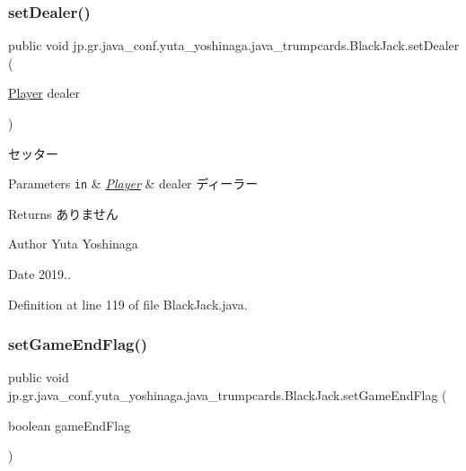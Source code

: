 \subsubsection{\texorpdfstring{set\+Dealer()}{setDealer()}}
{\footnotesize\ttfamily public void jp.\+gr.\+java\+\_\+conf.\+yuta\+\_\+yoshinaga.\+java\+\_\+trumpcards.\+Black\+Jack.\+set\+Dealer (\begin{DoxyParamCaption}\item[{\hyperlink{classjp_1_1gr_1_1java__conf_1_1yuta__yoshinaga_1_1java__trumpcards_1_1_player}{Player}}]{dealer }\end{DoxyParamCaption})}



セッター 


\begin{DoxyParams}[1]{Parameters}
\mbox{\tt in}  & {\em \hyperlink{classjp_1_1gr_1_1java__conf_1_1yuta__yoshinaga_1_1java__trumpcards_1_1_player}{Player}} & dealer ディーラー \\
\hline
\end{DoxyParams}
\begin{DoxyReturn}{Returns}
ありません 
\end{DoxyReturn}
\begin{DoxyAuthor}{Author}
Yuta Yoshinaga 
\end{DoxyAuthor}
\begin{DoxyDate}{Date}
2019.. 
\end{DoxyDate}


Definition at line 119 of file Black\+Jack.\+java.

\mbox{\label{classjp_1_1gr_1_1java__conf_1_1yuta__yoshinaga_1_1java__trumpcards_1_1_black_jack_a75ef56d0490e7b343fc6c02acbe43dd7}} 
\subsubsection{\texorpdfstring{set\+Game\+End\+Flag()}{setGameEndFlag()}}
{\footnotesize\ttfamily public void jp.\+gr.\+java\+\_\+conf.\+yuta\+\_\+yoshinaga.\+java\+\_\+trumpcards.\+Black\+Jack.\+set\+Game\+End\+Flag (\begin{DoxyParamCaption}\item[{boolean}]{game\+End\+Flag }\end{DoxyParamCaption})}



